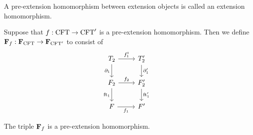 \begin{defn}
A pre-extension homomorphism between extension objects is called an extension
homomorphism.
\end{defn}

\begin{defn}
Suppose that $f:\mathrm{CFT}\to\mathrm{CFT}'$ is a pre-extension homomorphism. Then we
define $\mathbf{F}_{f}:\mathbf{F}_{\mathrm{CFT}}\to\mathbf{F}_{\mathrm{CFT}'}$ to consist of
\begin{equation*}
\begin{tikzcd}
\stesyst_2
  \ar{r}{f^t_1}
  \ar{d}[swap]{\ebd[1]}
  &
\stesyst_2'
  \ar{d}{\ebd[1]'}
  \\
\stesysf_2
  \ar{r}{f_2}
  \ar{d}[swap]{\eft[1]}
  &
\stesysf_2'
  \ar{d}{\eft[1]'}
  \\
\stesysf
  \ar{r}[swap]{f_1}
  &
\stesysf'
\end{tikzcd}
\end{equation*}
\end{defn}

\begin{lem}
The triple $\mathbf{F}_{f}$ is a pre-extension homomorphism.
\end{lem}

